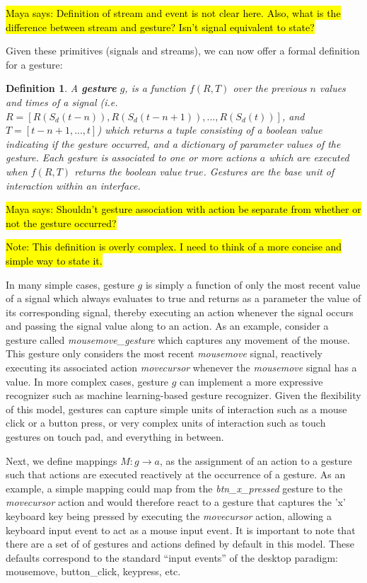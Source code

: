 \documentclass{article}
\newtheorem{define}{Definition}
\begin{document}
\hl{\tiny Maya says: Definition of stream and event is not clear here. Also, what is the difference between stream and gesture? Isn't signal equivalent to state?}

Given these primitives (signals and streams), we can now offer a formal definition for a gesture:

\begin{define}
\label{def:gesture}
A \textbf{gesture} $g$, is a function $f(R, T)$ over the previous $n$ values and times of a signal (i.e. $R = [R(S_d(t-n)), R(S_d(t-n+1)), ..., R(S_d(t))]$, and $T = [t - n + 1, ... , t]$) which returns a tuple consisting of a boolean value indicating if the gesture occurred, and a dictionary of parameter values of the gesture.
Each gesture is associated to one or more actions $a$ which are executed when $f(R,T)$ returns the boolean value $true$. Gestures are the base unit of interaction within an interface.
\end{define}

\hl{\tiny Maya says: Shouldn't gesture association with action be separate from whether or not the gesture occurred?}

\hl{Note: This definition is overly complex.
I need to think of a more concise and simple way to state it.}

\noindent
In many simple cases, gesture $g$ is simply a function of only the most recent value of a signal which always evaluates to true and returns as a parameter the value of its corresponding signal, thereby executing an action whenever the signal occurs and passing the signal value along to an action.
As an example, consider a gesture called \textit{mousemove\_gesture} which captures any movement of the mouse. This gesture only considers the most recent \textit{mousemove} signal, reactively executing its associated action \textit{movecursor} whenever the \textit{mousemove} signal has a value. In more complex cases, gesture $g$ can implement a more expressive recognizer such as machine learning-based gesture recognizer. Given the flexibility of this model, gestures can capture simple units of interaction such as a mouse click or a button press, or very complex units of interaction such as touch gestures on touch pad, and everything in between.

Next, we define mappings $M: g \rightarrow a$, as the assignment of an action to a gesture such that actions are executed reactively at the occurrence of a gesture.
As an example, a simple mapping could map from the \textit{btn\_x\_pressed} gesture to the \textit{movecursor} action and would therefore react to a gesture that captures the 'x' keyboard key being pressed by executing the \textit{movecursor} action, allowing a keyboard input event to act as a mouse input event. It is important to note that there are a set of of gestures and actions defined by default in this model. These defaults correspond to the standard ``input events'' of the desktop paradigm: mousemove, button\_click, keypress, etc. 
\end{document}
